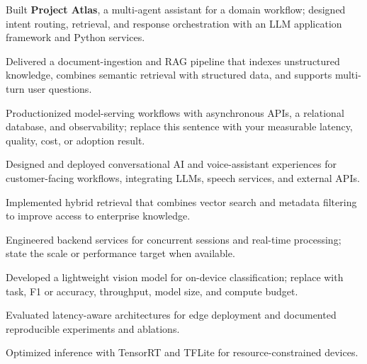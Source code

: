 \begin{resumeBullets}
  \item Built \textbf{Project Atlas}, a multi-agent assistant for a domain workflow; designed intent routing, retrieval, and response orchestration with an LLM application framework and Python services.
  \item Delivered a document-ingestion and RAG pipeline that indexes unstructured knowledge, combines semantic retrieval with structured data, and supports multi-turn user questions.
  \item Productionized model-serving workflows with asynchronous APIs, a relational database, and observability; replace this sentence with your measurable latency, quality, cost, or adoption result.
\end{resumeBullets}

\begin{resumeBullets}
  \item Designed and deployed conversational AI and voice-assistant experiences for customer-facing workflows, integrating LLMs, speech services, and external APIs.
  \item Implemented hybrid retrieval that combines vector search and metadata filtering to improve access to enterprise knowledge.
  \item Engineered backend services for concurrent sessions and real-time processing; state the scale or performance target when available.
\end{resumeBullets}

\begin{resumeBullets}
  \item Developed a lightweight vision model for on-device classification; replace with task, F1 or accuracy, throughput, model size, and compute budget.
  \item Evaluated latency-aware architectures for edge deployment and documented reproducible experiments and ablations.
  \item Optimized inference with TensorRT and TFLite for resource-constrained devices.
\end{resumeBullets}
